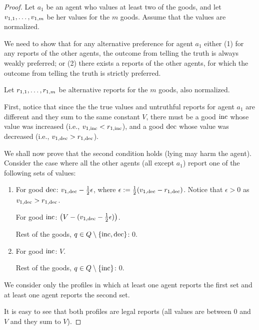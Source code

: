 \begin{proof}
    Let $a_1$ be an agent who values at least two of the
    goods, and let $v_{1,1}, \ldots, v_{1,m}$ be her values for the $m$ goods. Assume that the values are normalized.
    
     We need to show that for any alternative preference for agent $a_1$ either (1) for any reports of the other agents, the outcome from telling the truth is always weakly preferred; or (2) there exists a reports of the other agents, for which the outcome from telling the truth is strictly preferred.

     Let $r_{1,1}, \ldots, r_{1,m}$ be alternative reports for the $m$ goods, also normalized.

     First, notice that since the the true values and untruthful reports for agent $a_1$ are different and they sum to the same constant $V$, there must be a good $\mathrm{inc}$ whose value was increased (i.e., $ v_{1,\mathrm{inc}} < r_{1,\mathrm{inc}}$), and a good $\mathrm{dec}$ whose value was decreased (i.e., $ v_{1,\mathrm{dec}} > r_{1,\mathrm{dec}}$).


     We shall now prove that the second condition holds (lying may harm the agent). 
     Consider the case where all the other agents (all except $a_1$) report one of the following sets of values: 
     \begin{enumerate}
         \item For good $\mathrm{dec}$: $v_{1,\mathrm{dec}} - \frac{1}{2}\epsilon$, where  $\epsilon := \frac{1}{2}(v_{1,\mathrm{dec}} - r_{1,\mathrm{dec}})$. Notice that $\epsilon > 0$ as $ v_{1,\mathrm{dec}} > r_{1,\mathrm{dec}}$.

         For good $\mathrm{inc}$: $\left(V - (v_{1,\mathrm{dec}} - \frac{1}{2}\epsilon)\right)$.

         Rest of the goods, $q \in Q \setminus \{\mathrm{inc}, \mathrm{dec}\}$: $0$.

         \item For good $\mathrm{inc}$: $V$.

         Rest of the goods, $q \in Q \setminus \{\mathrm{inc}\}$: $0$.
     \end{enumerate}
     We consider only the profiles in which at least one agent reports the first set and at least one agent reports the second set.

     It is easy to see that both profiles are legal reports (all values are between $0$ and $V$ and they sum to $V$).


\end{proof}

